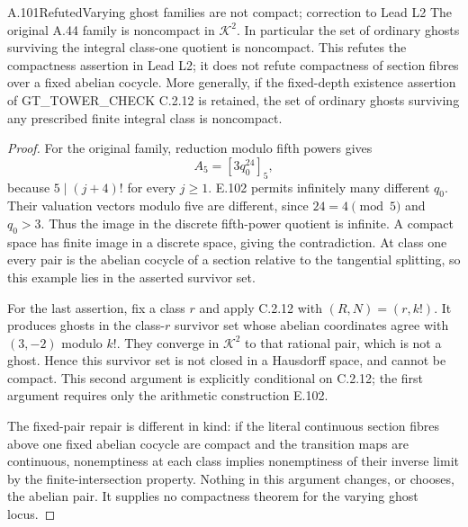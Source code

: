 \begin{result}{A.101}{Refuted}{Varying ghost families are not compact; correction to Lead L2}
The original A.44 family is noncompact in $\mathcal K^2$. In particular
the set of ordinary ghosts surviving the integral class-one quotient
is noncompact. This refutes the compactness assertion in Lead L2;
it does not refute compactness of section fibres over a fixed abelian
cocycle. More generally, if the fixed-depth existence assertion of
GT\_TOWER\_CHECK C.2.12 is retained, the set of ordinary ghosts
surviving any prescribed finite integral class is noncompact.
\end{result}
\begin{proof}
For the original family, reduction modulo fifth powers gives
\[
A_5=[3q_0^{24}]_5,
\]
because $5\mid(j+4)!$ for every $j\ge1$. E.102 permits infinitely
many different $q_0$. Their valuation vectors modulo five are
different, since $24=4\pmod5$ and $q_0>3$. Thus the image in the
discrete fifth-power quotient is infinite. A compact space has finite
image in a discrete space, giving the contradiction. At class one
every pair is the abelian cocycle of a section relative to the
tangential splitting, so this example lies in the asserted survivor
set.

For the last assertion, fix a class $r$ and apply C.2.12 with
$(R,N)=(r,k!)$. It produces ghosts in the class-$r$ survivor set whose
abelian coordinates agree with $(3,-2)$ modulo $k!$. They converge in
$\mathcal K^2$ to that rational pair, which is not a ghost. Hence this
survivor set is not closed in a Hausdorff space, and cannot be compact.
This second argument is explicitly conditional on C.2.12; the first
argument requires only the arithmetic construction E.102.

The fixed-pair repair is different in kind: if the literal continuous
section fibres above one fixed abelian cocycle are compact and the
transition maps are continuous, nonemptiness at each class implies
nonemptiness of their inverse limit by the finite-intersection
property. Nothing in this argument changes, or chooses, the abelian
pair. It supplies no compactness theorem for the varying ghost locus.
\end{proof}
